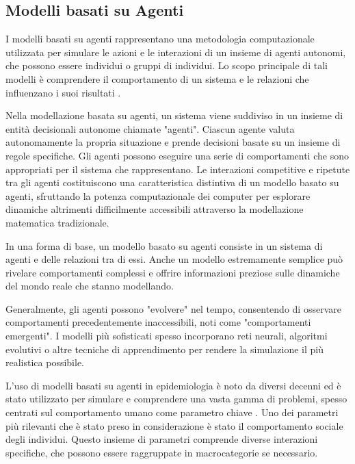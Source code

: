 \subsection{Modelli basati su Agenti}

I modelli basati su agenti rappresentano una metodologia computazionale 
utilizzata per simulare le azioni e le interazioni di un insieme di agenti 
autonomi, che possono essere individui o gruppi di individui. 
Lo scopo principale di tali modelli è comprendere il comportamento di un 
sistema e le relazioni che influenzano i suoi risultati \cite{7822080}.

Nella modellazione basata su agenti, un sistema viene suddiviso in un 
insieme di entità decisionali autonome chiamate "agenti". Ciascun agente 
valuta autonomamente la propria situazione e prende decisioni basate su 
un insieme di regole specifiche. Gli agenti possono eseguire una serie 
di comportamenti che sono appropriati per il sistema che rappresentano. 
Le interazioni competitive e ripetute tra gli agenti costituiscono una 
caratteristica distintiva di un modello basato su agenti, sfruttando la 
potenza computazionale dei computer per esplorare dinamiche altrimenti 
difficilmente accessibili attraverso la modellazione matematica tradizionale.

In una forma di base, un modello basato su agenti consiste in un sistema 
di agenti e delle relazioni tra di essi. Anche un modello estremamente 
semplice può rivelare comportamenti complessi e offrire informazioni 
preziose sulle dinamiche del mondo reale che stanno modellando.

Generalmente, gli agenti possono "evolvere" nel tempo, consentendo di 
osservare comportamenti precedentemente inaccessibili, noti come 
"comportamenti emergenti". I modelli più sofisticati spesso incorporano 
reti neurali, algoritmi evolutivi o altre tecniche di apprendimento per 
rendere la simulazione il più realistica possibile.

L'uso di modelli basati su agenti in epidemiologia è noto da diversi 
decenni ed è stato utilizzato per simulare e comprendere una vasta gamma 
di problemi, spesso centrati sul comportamento umano come parametro chiave 
\cite{Bissett2021} \cite{El-Sayed2012-ac} \cite{Groff2019} \cite{Tracy2018-lc}. 
Uno dei parametri più rilevanti che è stato preso in considerazione è 
stato il comportamento sociale degli individui. Questo insieme di 
parametri comprende diverse interazioni specifiche, che possono essere 
raggruppate in macrocategorie se necessario.

